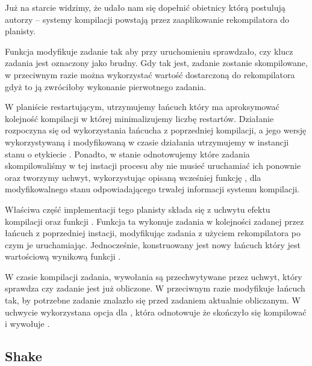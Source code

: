 

Już na starcie widzimy, że udało nam się dopełnić obietnicy którą postulują autorzy \BSaLC{} -- systemy kompilacji powstają przez zaaplikowanie rekompilatora do planisty.

Funkcja  modyfikuje zadanie tak aby przy uruchomieniu sprawdzało, czy klucz zadania jest oznaczony jako brudny. Gdy tak jest, zadanie zostanie skompilowane, w przeciwnym razie można wykorzystać wartość dostarczoną do rekompilatora gdyż to ją zwróciłoby wykonanie pierwotnego zadania. 



W planiście restartującym, utrzymujemy łańcuch który ma aproksymować kolejność kompilacji w której minimalizujemy liczbę restartów. Działanie rozpoczyna się od wykorzystania łańcucha z poprzedniej kompilacji, a jego wersję wykorzystywaną i modyfikowaną w czasie działania utrzymujemy w instancji stanu o etykiecie . Ponadto, w stanie  odnotowujemy które zadania skompilowaliśmy w tej instacji procesu aby nie musieć uruchamiać ich ponownie oraz tworzymy uchwyt, wykorzystując opisaną wcześniej funkcję , dla modyfikowalnego stanu odpowiadającego trwałej informacji systemu kompilacji.



Właściwa część implementacji tego planisty składa się z uchwytu efektu kompilacji  oraz funkcji . Funkcja ta wykonuje zadania w kolejności zadanej przez łańcuch z poprzedniej instacji, modyfikując zadania z użyciem rekompilatora po czym je uruchamiając. Jednocześnie, konstruowany jest nowy łańcuch który jest wartościową wynikową funkcji .

W czasie kompilacji zadania, wywołania  są przechwytywane przez uchwyt, który sprawdza czy zadanie jest już obliczone. W przeciwnym razie modyfikuje łańcuch tak, by potrzebne zadanie znalazło się przed zadaniem aktualnie obliczanym. W uchwycie wykorzystana opcja dla , która odnotowuje że skończyło się kompilować i wywołuje .



\subsection{Shake}

